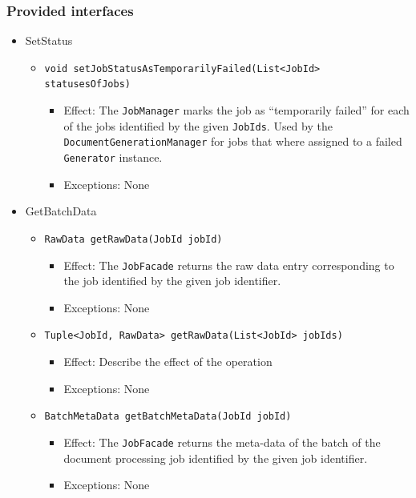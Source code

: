 \documentclass[a4paper,10pt]{article}
\begin{document}
\subsubsection*{Provided interfaces}
\begin{itemize}
    \item SetStatus
    \begin{itemize}
        \item \texttt{void setJobStatusAsTemporarilyFailed(List<JobId> statusesOfJobs)}
        \begin{itemize}
            \item Effect: The \texttt{JobManager} marks the job as ``temporarily failed'' for each of the jobs identified by the given \texttt{JobIds}. Used by the \texttt{DocumentGenerationManager} for jobs that where assigned to a failed \texttt{Generator} instance.
            \item Exceptions: None
        \end{itemize}
    \end{itemize}
    
	\item GetBatchData
    \begin{itemize}
        \item \texttt{RawData getRawData(JobId jobId)}
        \begin{itemize}
            \item Effect: The \texttt{JobFacade} returns the raw data entry corresponding to the job identified by the given job identifier.
            \item Exceptions: None
        \end{itemize}
        
        
        
        \item \texttt{Tuple<JobId, RawData> getRawData(List<JobId> jobIds)}
        \begin{itemize}
            \item Effect: Describe the effect of the operation
            \item Exceptions: None
        \end{itemize}
        
        
        \item \texttt{BatchMetaData getBatchMetaData(JobId jobId)}
        \begin{itemize}
            \item Effect: The \texttt{JobFacade} returns the meta-data of the batch of the document processing job identified by the given job identifier.
            \item Exceptions: None
        \end{itemize}
        

\end{itemize}
\end{itemize}
\end{document}
